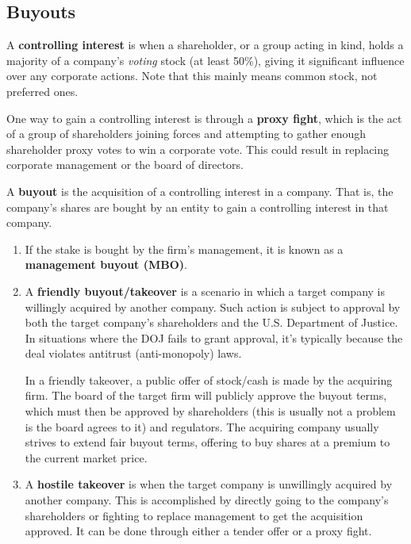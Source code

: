 \documentclass{article}
\begin{document}
  \subsection{Buyouts}

    \begin{definition}
      A \textbf{controlling interest} is when a shareholder, or a group acting in kind, holds a majority of a company's \textit{voting} stock (at least 50\%), giving it significant influence over any corporate actions. Note that this mainly means common stock, not preferred ones. 
    \end{definition}

    \begin{definition}
      One way to gain a controlling interest is through a \textbf{proxy fight}, which is the act of a group of shareholders joining forces and attempting to gather enough shareholder proxy votes to win a corporate vote. This could result in replacing corporate management or the board of directors. 
    \end{definition}

    \begin{definition}[Buyout]
      A \textbf{buyout} is the acquisition of a controlling interest in a company. That is, the company's shares are bought by an entity to gain a controlling interest in that company.  
      \begin{enumerate}
        \item If the stake is bought by the firm's management, it is known as a \textbf{management buyout (MBO)}.
        \item A \textbf{friendly buyout/takeover} is a scenario in which a target company is willingly acquired by another company. Such action is subject to approval by both the target company's shareholders and the U.S. Department of Justice. In situations where the DOJ fails to grant approval, it's typically because the deal violates antitrust (anti-monopoly) laws. 
        
        In a friendly takeover, a public offer of stock/cash is made by the acquiring firm. The board of the target firm will publicly approve the buyout terms, which must then be approved by shareholders (this is usually not a problem is the board agrees to it) and regulators. The acquiring company usually strives to extend fair buyout terms, offering to buy shares at a premium to the current market price.
        \item A \textbf{hostile takeover} is when the target company is unwillingly acquired by another company. This is accomplished by directly going to the company's shareholders or fighting to replace management to get the acquisition approved. It can be done through either a tender offer or a proxy fight. 
      \end{enumerate}
    \end{definition}
\end{document}
